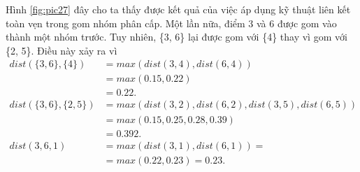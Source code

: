 Hình \ref{fig:pic27} đây cho ta thấy được kết quả của việc áp dụng kỹ thuật liên kết toàn vẹn trong gom nhóm phân cấp.
Một lần nữa, điểm 3 và 6 được gom vào thành một nhóm trước.
Tuy nhiên, \{3, 6\} lại được gom với \{4\} thay vì gom với \{2, 5\}.
Điều này xảy ra vì 
\begin{equation}
\begin{aligned}
dist(\{3, 6\}, \{4\})
&= max(dist(3, 4), dist(6, 4)) 		\\
&= max(0.15, 0.22) 					\\
&= 0.22.							\\
dist(\{3, 6\}, \{2, 5\})
&= max(dist(3, 2), dist(6, 2), dist(3, 5), dist(6, 5))			\\
&= max(0.15, 0.25, 0.28, 0.39)									\\
&= 0.392.										\\					
dist({3, 6}, {1})
&= max(dist(3, 1), dist(6, 1)) =	\\ 
&= max(0.22, 0.23) = 0.23.		\\
\end{aligned}
\end{equation}

